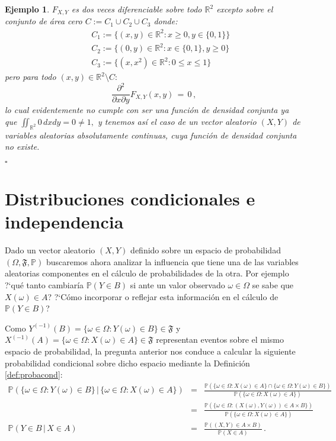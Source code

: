 \documentclass[spanish,10pt,letterpaper]{article}
\newtheorem{ejem}{Ejemplo}
\newcommand{\prob}{\mathbb{P}}
\newcommand{\Runo}{\mathbb{R}}
\newcommand{\qed}{\begin{flushright}$\square$\end{flushright}}
\begin{document}
\begin{ejem}
    $F_{X,Y}$ es dos veces diferenciable sobre todo $\Runo^2$ excepto sobre el conjunto de área cero $C:=C_1\cup C_2\cup C_3$ donde:
    \begin{eqnarray*}
        {} &{ }& C_1 := \{(x,y)\in\Runo^2:x\geq 0,y\in\{0,1\}\} \\
           &{ }& C_2 := \{(0,y)\in\Runo^2:x\in\{0,1\}, y\geq 0\} \\
           &{ }& C_3 := \{(x,x^2)\in\Runo^2:0\leq x\leq 1\}
    \end{eqnarray*}
    pero para todo $(x,y)\in\Runo^2\setminus C:$
    $$\frac{\partial^2}{\partial x\partial y}F_{X,Y}(x,y) \,=\, 0\,,$$
    lo cual evidentemente no cumple con ser una función de densidad conjunta ya que $\iint_{\Runo^2}0\,dxdy=0\neq 1,$ y tenemos así el caso de un vector aleatorio $(X,Y)$ de variables aleatorias absolutamente continuas, cuya función de densidad conjunta no existe. \qed  
\end{ejem}



	
\newpage
\section{Distribuciones condicionales e independencia}\label{sec:condicindep}
	
Dado un vector aleatorio $(X,Y)$ definido sobre un espacio de probabilidad $(\Omega,\mathfrak{F},\prob)$ buscaremos ahora analizar la influencia que tiene una de las variables aleatorias componentes en el cálculo de probabilidades de la otra. Por ejemplo ?`qué tanto cambiaría $\prob(Y\in B)$ si ante un valor observado $\omega\in\Omega$ se sabe que $X(\omega)\in A$? ?`Cómo incorporar o reflejar esta información en el cálculo de $\prob(Y\in B)$? 

\medskip 

Como $Y^{(-1)}(B)=\{\omega\in\Omega:Y(\omega)\in B\}\in\mathfrak{F}$ y $X^{(-1)}(A)=\{\omega\in\Omega:X(\omega)\in A\}\in\mathfrak{F}$ representan eventos sobre el mismo espacio de probabilidad, la pregunta anterior nos conduce a calcular la siguiente probabilidad condicional sobre dicho espacio mediante la Definición \ref{def:probacond}:
\begin{eqnarray}\label{eq:probacond}
    \prob(\{\omega\in\Omega:Y(\omega)\in B\}\,|\,\{\omega\in\Omega:X(\omega)\in A\}) &=& \frac{\prob(\{\omega\in\Omega:X(\omega)\in A\}\cap\{\omega\in\Omega:Y(\omega)\in B\})}{\prob(\{\omega\in\Omega:X(\omega)\in A\})} \nonumber \\ 
    &=& \frac{\prob(\{\omega\in\Omega:(X(\omega),Y(\omega))\in A\times B\})}{\prob(\{\omega\in\Omega:X(\omega)\in A\})} \nonumber \\
    \prob(Y\in B\,|\,X\in A) &=& \frac{\prob((X,Y)\in A\times B)}{\prob(X\in A)}\,.
\end{eqnarray}
\end{document}
